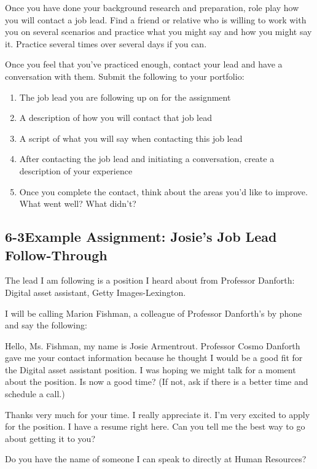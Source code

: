 Once you have done your background research and preparation, role play how you will contact a job lead. Find a friend or relative who is willing to work with you on several scenarios and practice what you might say and how you might say it. Practice several times over several days if you can.

Once you feel that you've practiced enough, contact your lead and have a conversation with them. Submit the following to your portfolio:
\begin{enumerate}[leftmargin=*]
\item The job lead you are following up on for the assignment
\item A description of how you will contact that job lead
\item A script of what you will say when contacting this job lead
\item After contacting the job lead and initiating a conversation, create a description of your experience
\item Once you complete the contact, think about the areas you'd like to improve. What went well? What didn't?
\end{enumerate}

\pagebreak \subsection*{6-3\quad Example Assignment: Josie's Job Lead Follow-Through}

The lead I am following is a position I heard about from Professor Danforth: Digital asset assistant, Getty Images-Lexington.

I will be calling Marion Fishman, a colleague of Professor Danforth's by phone and say the following:

Hello, Ms. Fishman, my name is Josie Armentrout. Professor Cosmo Danforth gave me your contact information because he thought I would be a good fit for the Digital asset assistant position. I was hoping we might talk for a moment about the position. Is now a good time? (If not, ask if there is a better time and schedule a call.)

Thanks very much for your time. I really appreciate it. I'm very excited to apply for the position. I have a resume right here. Can you tell me the best way to go about getting it to you?

Do you have the name of someone I can speak to directly at Human Resources?

